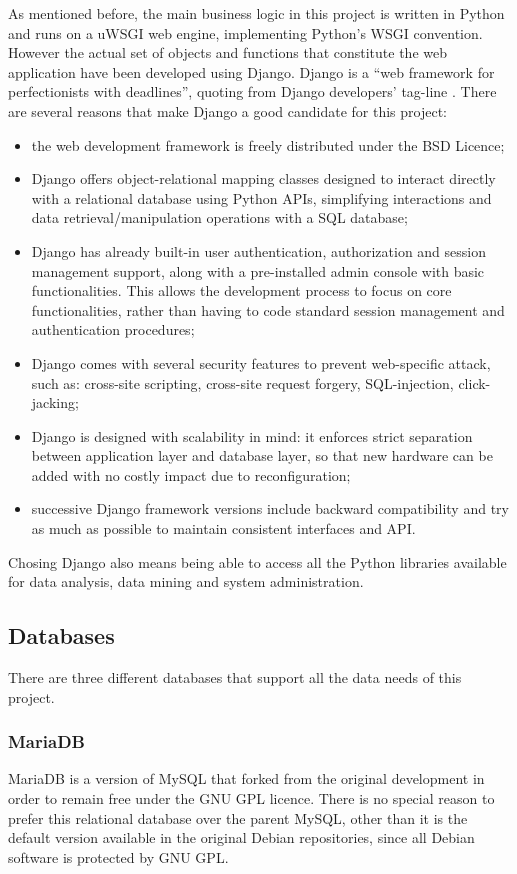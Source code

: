 As mentioned before, the main business logic in this project is written in
Python and runs on a uWSGI web engine, implementing Python's WSGI convention.
However the actual set of objects and functions that constitute the web application have been developed using Django.
Django is a ``web framework for perfectionists with deadlines'', quoting from
Django developers' tag-line \cite{Django}. There are several reasons that make
Django a good candidate for this project:
\begin{itemize}
  \item the web development framework is freely distributed under the BSD
  Licence;
  \item Django offers object-relational mapping classes designed to interact
  directly with a relational database using Python APIs, simplifying
  interactions and data retrieval/manipulation operations with a SQL
  database;
  \item Django has already built-in user authentication, authorization and
  session management support, along with a pre-installed admin console with basic
  functionalities. This allows the development process to focus on core
  functionalities, rather than having to code standard session management and
  authentication procedures;
  \item Django comes with several security features to prevent web-specific
  attack, such as: cross-site scripting, cross-site request forgery,
  SQL-injection, click-jacking;
  \item Django is designed with scalability in mind: it enforces strict
  separation between application layer and database layer, so that new hardware
  can be added with no costly impact due to reconfiguration;
  \item successive Django framework versions include backward compatibility and
  try as much as possible to maintain consistent interfaces and API.
\end{itemize}

Chosing Django also means being able to access all the Python libraries
available for data analysis, data mining and system administration.

\subsection{Databases}
There are three different databases that support all the data needs of this
project.

\subsubsection{MariaDB}
MariaDB is a version of MySQL that forked from the original development in order
to remain free under the GNU GPL licence. There is no special reason to prefer
this relational database over the parent MySQL, other than it is the default
version available in the original Debian repositories, since all Debian software
is protected by GNU GPL.

